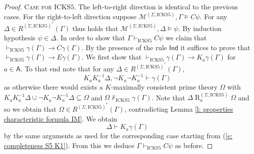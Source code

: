 \documentclass[10pt,a4paper]{amsart}
\newcommand\A{\mathsf{A}}
\newcommand\C {C}
\newcommand{\E}{E}
\newcommand{\K}{K}
\newcommand{\Rel}{\mathrel{R}}
\newcommand{\agi}{a}
\newcommand{\fw}{\mathcal{M}}
\newcommand{\hickss}{\mathrm{ICKS5}}
\begin{document}
\begin{proof}
 \noindent \textsc{Case for $\hickss$.} The left-to-right direction is identical to the previous cases. For the right-to-left direction suppose $\fw^{(\Sigma, \hickss)}, \Gamma \models \C \psi$. For any $\Delta \in R^{(\Sigma, \hickss)^*}(\Gamma)$ thus holds that $\fw^{(\Sigma, \hickss)}, \Delta \models \psi$. By induction hypothesis $\psi \in \Delta$. In order to show that $\Gamma \vdash_\hickss \C \psi$ we claim that $\vdash_\hickss \gamma(\Gamma) \rightarrow \C \gamma(\Gamma)$. By the presence of the rule $\mathsf{Ind}$ it suffices to prove that $\vdash_\hickss \gamma(\Gamma) \rightarrow \E \gamma(\Gamma)$. We first show that $\vdash_\hickss \gamma(\Gamma) \rightarrow \K_\agi \gamma(\Gamma)$ for $\agi \in \A$. To that end note that for any $\Delta \in R^{(\Sigma, \hickss)^*}(\Gamma)$,
 \begin{equation*}
     \K_\agi \K_\agi^{-1} \Delta, \neg \K_\agi \neg \K_\agi^{-1} \vdash \gamma(\Gamma)
 \end{equation*}
 as otherwise there would exists a $\K$-maximally consistent prime theory $\Omega$ with $\K_\agi \K_\agi^{-1} \Delta \cup \neg \K_\agi \neg \K_\agi^{-1} \Delta \subseteq \Omega$ and $\Omega \not \vdash_\hickss \gamma(\Gamma)$. Note that $\Delta \Rel_\agi^{(\Sigma, \hickss)} \Omega$ and so we obtain that $\Omega \in R^{(\Sigma, \hickss)^*}(\Gamma)$, contradicting Lemma \ref{l: properties characteristic formula IM}. We obtain
 \begin{equation*}
     \Delta \vdash \K_\agi \gamma(\Gamma)
 \end{equation*}
 by the same arguments as used for the corresponding case starting from (\ref{e: completeness S5 K1}). From this we deduce $\Gamma \vdash_\hickss \C \psi$ as before.
\end{proof}
\end{document}
